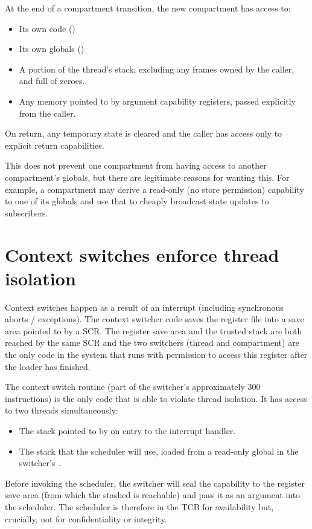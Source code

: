 At the end of a compartment transition, the new compartment has access to:

\begin{itemize}
	\item Its own code (\PCC)
	\item Its own globals (\CGP)
	\item A portion of the thread's stack, excluding any frames owned by the caller, and full of zeroes.
	\item Any memory pointed to by argument capability registers, passed explicitly from the caller.
\end{itemize}

On return, any temporary state is cleared and the caller has access only to explicit return capabilities.

This does not prevent one compartment from having access to another compartment's globals, but there are legitimate reasons for wanting this.
For example, a compartment may derive a read-only (no store permission) capability to one of its globals and use that to cheaply broadcast state updates to subscribers.

\section{Context switches enforce thread isolation}

Context switches happen as a result of an interrupt (including synchronous aborts / exceptions).
The context switcher code saves the register file into a save area pointed to by a SCR.
The register save area and the trusted stack are both reached by the same SCR and the two switchers (thread and compartment) are the only code in the system that runs with permission to access this register after the loader has finished.

The context switch routine (part of the switcher's approximately 300 instructions) is the only code that is able to violate thread isolation.
It has access to two threads simultaneously:

\begin{itemize}
	\item The stack pointed to by \CSP{} on entry to the interrupt handler.
	\item The stack that the scheduler will use, loaded from a read-only global in the switcher's \PCC{}.
\end{itemize}

Before invoking the scheduler, the switcher will seal the capability to the register save area (from which the stashed \CSP{} is reachable) and pass it as an argument into the scheduler.
The scheduler is therefore in the TCB for availability but, crucially, not for confidentiality or integrity.

